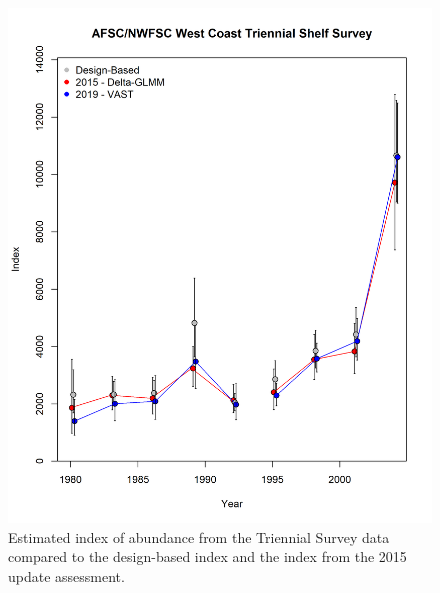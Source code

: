 \documentclass[12pt,]{article}
\begin{document}
\FloatBarrier

\begin{figure}
\centering
\includegraphics{Figures/Triennial_Index_w_VAST_gamma.png}
\caption{Estimated index of abundance from the Triennial Survey data
compared to the design-based index and the index from the 2015 update
assessment. \label{fig:tri_index}}
\end{figure}

\FloatBarrier
\end{document}
